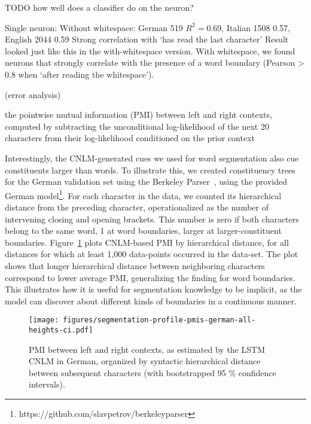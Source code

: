TODO how well does a classifier do on the neuron?

Single neuron:
Without whitespace: German 519 $R^2 = $0.69, Italian 1508 0.57, English 2044 0.59
Strong correlation with `has read the last character'
Result looked just like this in the with-whitespace version.
With whitespace, we found neurons that strongly correlate with the presence of a word boundary (Pearson > 0.8 when `after reading the whitespace').




(error analysis)


the pointwise mutual
information (PMI) between left and right contexts, computed by
subtracting the unconditional log-likelihood of the next 20 characters
from their log-likelihood conditioned on the prior context

Interestingly, the CNLM-generated cues we used for word segmentation
also cue constituents larger than words. To illustrate this, we created constituency trees for the German
validation set using the Berkeley Parser~\cite{petrov2007improved}, using the provided German model\footnote{https://github.com/slavpetrov/berkeleyparser}.
For each character in the data, we counted its hierarchical distance
from the preceding character, operationalized as the number of
intervening closing and opening brackets.  This number is zero if both characters belong to the same word, 1 at word
boundaries, larger at larger-constituent boundaries. Figure~\ref{fig:syntax-depth} plots CNLM-based PMI by
hierarchical distance, for all distances for which at least 1,000
data-points occurred in the data-set.  The plot shows that longer
hierarchical distance between neighboring characters correspond to
lower average PMI, generalizing the finding for word boundaries.  This
illustrates how it is useful for segmentation knowledge to be
implicit, as the model can discover about different kinds of
boundaries in a continuous manner.

\begin{figure}
  \center
\texttt{[image: figures/segmentation-profile-pmis-german-all-heights-ci.pdf]}
\caption{PMI between left and right contexts, as estimated by the LSTM CNLM in German, organized by syntactic hierarchical distance between subsequent characters (with bootstrapped 95 \% confidence intervals).}\label{fig:syntax-depth}
\end{figure}



